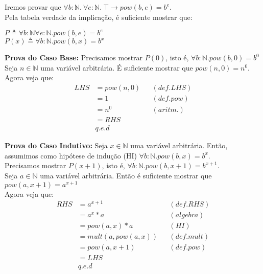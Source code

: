 \documentclass{article}
\begin{document}
\noindent Iremos provar que $\forall b:\mathbb{N}.\:\forall e:\mathbb{N}.\:\top\rightarrow pow(b, e) = b^e$. \\
Pela tabela verdade da implicação, é suficiente mostrar que: \\
\begin{center}
$P \triangleq \forall b:\mathbb{N} \forall e:\mathbb{N}. pow(b, e) = b^e$\\
$P(x) \triangleq \forall b:\mathbb{N}. pow(b, x) = b^x$\\
\end{center}
\textbf{Prova do Caso Base:} Precisamos mostrar $P(0)$, isto é, $\forall b:\mathbb{N}. pow(b, 0) = b^0$\\
Seja $n \in \mathbb{N}$ uma variável arbitrária. É suficiente mostrar que $pow(n, 0) = n^0$.\\
Agora veja que:
\begin{align*}
LHS &= pow(n, 0) && (def. LHS)\\
&= 1 && (def. pow)\\
&= n^0 && (aritm.)\\
&= RHS\\
& q.e.d
\end{align*}

\noindent \textbf{Prova do Caso Indutivo:} Seja $x \in \mathbb{N}$ uma variável arbitrária. Então, assumimos como hipótese de indução (HI)
$\forall b:\mathbb{N}. pow(b, x) = b^x$.\\
Precisamos mostrar $P(x+1)$, isto é, $\forall b:\mathbb{N}. pow(b, x+1) = b^{x+1}$.\\
Seja $a \in \mathbb{N}$ uma variável arbitrária. Então é suficiente mostrar que $pow(a, x+1) = a^{x+1}$\\
Agora veja que:
\begin{align*}
RHS &= a^{x+1} && (def. RHS)\\
&= a^x * a && (algebra)\\
&= pow(a, x) * a && (HI)\\
&= mult(a, pow(a, x)) && (def. mult)\\
&= pow(a, x+1) && (def. pow)\\
&= LHS\\
& q.e.d
\end{align*}
\end{document}

